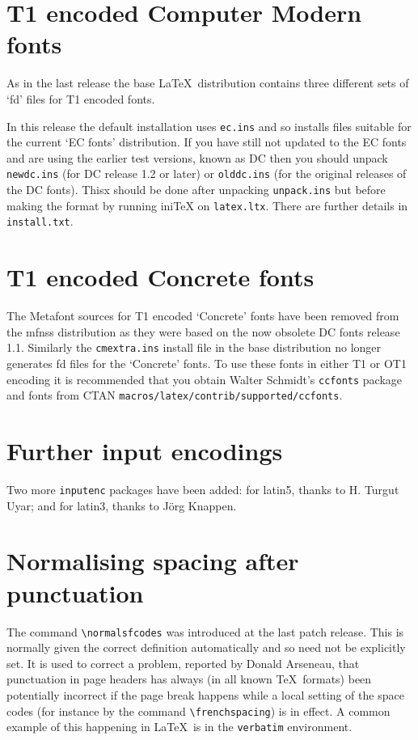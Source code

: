 \documentclass{ltnews}
\providecommand\pkg[1]{\texttt{#1}}
\providecommand\env[1]{\texttt{#1}}
\providecommand\file[1]{\texttt{#1}}
\begin{document}
\maketitle

\section{T1 encoded Computer Modern fonts}
As in the last release the base \LaTeX\ distribution contains
three different sets of `fd' files for T1 encoded fonts.

In this release the default installation uses \file{ec.ins}
and so installs files suitable for the current `EC fonts'
distribution. If you have still not updated to the EC fonts and
are using the earlier test versions, known as DC then you should
unpack \file{newdc.ins} (for DC release 1.2 or later) or
\file{olddc.ins} (for the original releases of the DC fonts).
Thisx should be done after unpacking \file{unpack.ins} but
before making the format by running ini\TeX{} on \file{latex.ltx}.
There are further details in \file{install.txt}.


\section{T1 encoded Concrete fonts}
The Metafont sources for T1 encoded `Concrete' fonts have been
removed from the \textsf{mfnss} distribution as they were based
on the now obsolete DC fonts release 1.1. Similarly the
\file{cmextra.ins} install file in the \textsf{base} distribution no
longer generates fd files for the `Concrete' fonts.
To use these fonts in either T1 or OT1 encoding it is
recommended that you obtain Walter Schmidt's \pkg{ccfonts} package
and fonts from CTAN \file{macros/latex/contrib/supported/ccfonts}.


\section{Further input encodings}
Two more \pkg{inputenc} packages have been added: for latin5,
thanks to H. Turgut Uyar; and for latin3, thanks to J\"org Knappen.


\section{Normalising spacing after punctuation}
The command \verb|\normalsfcodes| was introduced at the last patch
release. This is normally given the correct definition automatically
and so need not be explicitly set. It is used to correct a problem,
reported by Donald Arseneau, that punctuation in page headers has
always (in all known \TeX\ formats) been potentially incorrect if the
page break happens while a local setting of the space codes (for
instance by the command \verb|\frenchspacing|) is in effect. A common
example of this happening in \LaTeX\ is in the \env{verbatim}
environment.
\end{document}

